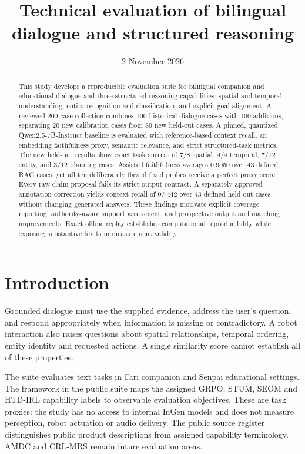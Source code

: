 \documentclass{amsart}
\title[Bilingual dialogue and structured reasoning evaluation]
  {Technical evaluation of bilingual dialogue and structured reasoning}
\date{2 November 2026}
\theoremstyle{definition}
\numberwithin{equation}{section}
\begin{document}
\raggedbottom

\begin{abstract}
This study develops a reproducible evaluation suite for bilingual companion and educational dialogue and three structured reasoning capabilities: spatial and temporal understanding, entity recognition and classification, and explicit-goal alignment. A reviewed 200-case collection combines 100 historical dialogue cases with 100 additions, separating 20 new calibration cases from 80 new held-out cases. A pinned, quantized Qwen2.5-7B-Instruct baseline is evaluated with reference-based context recall, an embedding faithfulness proxy, semantic relevance, and strict structured-task metrics. The new held-out results show exact task success of 7/8 spatial, 4/4 temporal, 7/12 entity, and 3/12 planning cases. Assisted faithfulness averages 0.9050 over 43 defined RAG cases, yet all ten deliberately flawed fixed probes receive a perfect proxy score. Every raw claim proposal fails its strict output contract. A separately approved annotation correction yields context recall of 0.7442 over 43 defined held-out cases without changing generated answers. These findings motivate explicit coverage reporting, authority-aware support assessment, and prospective output and matching improvements. Exact offline replay establishes computational reproducibility while exposing substantive limits in measurement validity.
\end{abstract}
\maketitle
\tableofcontents

\section{Introduction}\label{sec:introduction}
Grounded dialogue must use the supplied evidence, address the user's question, and respond appropriately when information is missing or contradictory. A robot interaction also raises questions about spatial relationships, temporal ordering, entity identity and requested actions. A single similarity score cannot establish all of these properties.

The suite evaluates text tasks in Fari companion and Senpai educational settings. The framework in the public suite \cite{suite} maps the assigned GRPO, STUM, SEOM and HTD-IRL capability labels to observable evaluation objectives. These are task proxies: the study has no access to internal InGen models and does not measure perception, robot actuation or audio delivery. The public source register distinguishes public product descriptions from assigned capability terminology. AMDC and CRL-MRS remain future evaluation areas.
\end{document}
